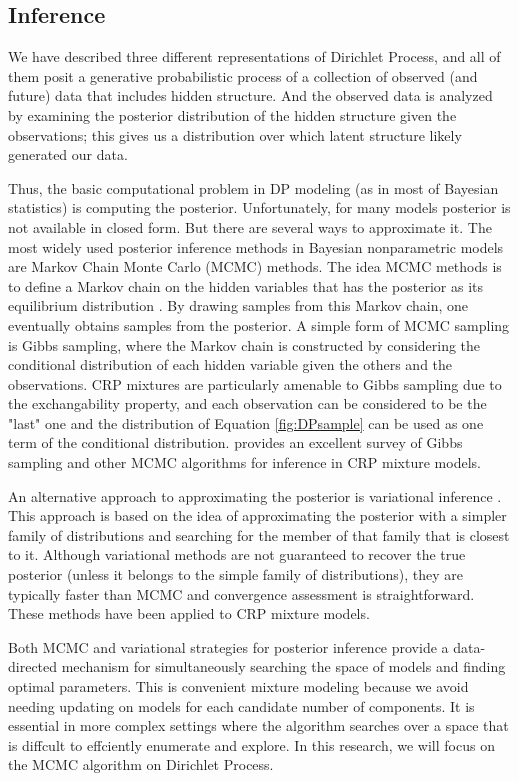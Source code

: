 	\subsection{Inference}
	We have described three different representations of Dirichlet Process, and all of them posit a generative probabilistic process of a collection of observed (and future) data that includes hidden structure. And the observed data is analyzed by examining the posterior distribution of the hidden structure given the observations; this
	gives us a distribution over which latent structure likely generated our data. 
	
	Thus, the basic computational problem in DP modeling (as in most of Bayesian statistics) is computing the posterior. Unfortunately, for many models posterior is not available in closed form. But there are several ways to approximate it. The most widely used posterior inference methods in Bayesian nonparametric models are
	Markov Chain Monte Carlo (MCMC) methods. The idea MCMC methods is to define a Markov chain on the hidden variables that has the posterior as its equilibrium distribution \cite{Andrieu2003}. By drawing samples from this Markov chain, one eventually obtains samples from the posterior. A simple form of MCMC sampling is Gibbs sampling, where the Markov chain is constructed by considering the conditional distribution of each hidden variable given the others and the observations. CRP mixtures are
	particularly amenable to Gibbs sampling due to the exchangability property, and each observation can be considered to be the "last" one and the distribution of Equation \ref{fig:DPsample} can be used as one term of the conditional distribution. \cite{Andrieu2003} provides an excellent survey of Gibbs sampling and other MCMC
	algorithms for inference in CRP mixture models.
	
	An alternative approach to approximating the posterior is variational inference \cite{Jordan1999}. This approach is based on the idea of approximating the posterior with a simpler family of distributions and searching for the member of that family that
	is closest to it. Although variational methods are not guaranteed to recover the true posterior (unless it belongs to the simple family of distributions), they are typically faster than MCMC \cite{Blei2006}and convergence assessment is straightforward. These methods have been applied to CRP mixture
	models. 
	
	Both MCMC and variational strategies for posterior inference provide a data-directed mechanism for simultaneously searching the space of models and finding optimal parameters. This is convenient  mixture modeling because we avoid needing updating on models for each candidate number of components. It is essential in more complex settings where the algorithm searches over a space that is diffcult to effciently enumerate and explore. In this research, we will focus on the MCMC algorithm on Dirichlet Process.

